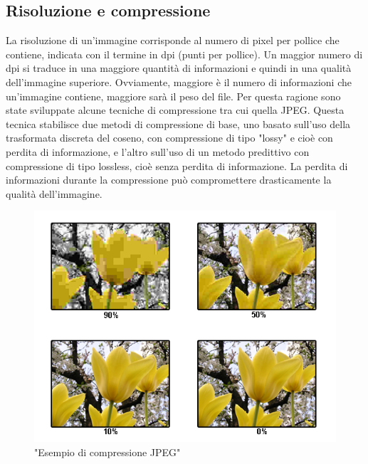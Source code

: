 \documentclass[a4paper,11pt]{article}
\begin{document}
    \subsection{Risoluzione e compressione}
    La risoluzione di un'immagine corrisponde al numero di pixel per pollice che contiene, indicata con il termine in dpi (punti per pollice). 
    Un maggior numero di dpi si traduce in una maggiore quantità di informazioni e quindi in una qualità dell'immagine superiore. 
    Ovviamente, maggiore è il numero di informazioni che un'immagine contiene, maggiore sarà il peso del file. 
    Per questa ragione sono state sviluppate alcune tecniche di compressione tra cui quella JPEG. Questa tecnica stabilisce due metodi di compressione di base,
    uno basato sull'uso della trasformata discreta del coseno, con compressione di tipo "lossy" e cioè con perdita di informazione, e l'altro sull'uso di un metodo predittivo
    con compressione di tipo lossless, cioè senza perdita di informazione. La perdita di informazioni durante la compressione può compromettere drasticamente la qualità dell'immagine.
    \begin{figure}[h]
        \centering
        \includegraphics[scale=0.7]{jpeg.png}
        \caption{"Esempio di compressione JPEG"}
    \end{figure}
    \newpage
\end{document}
